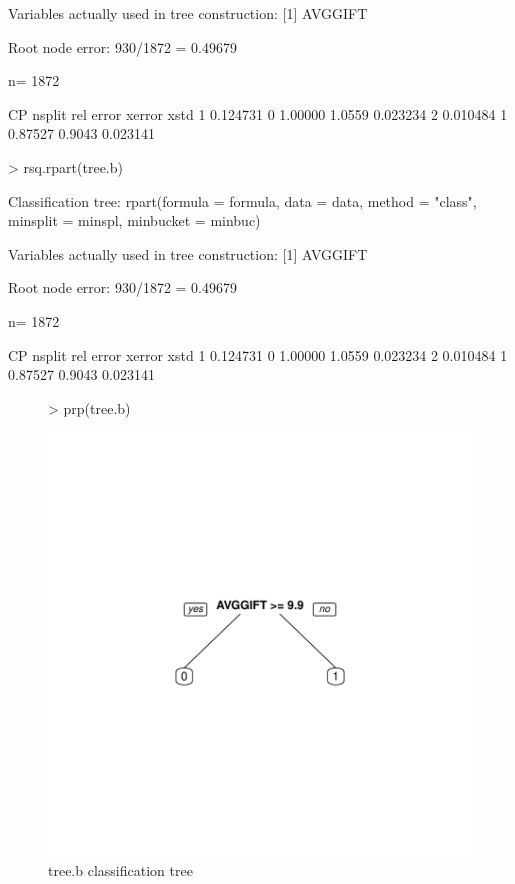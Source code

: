 \documentclass{article}
\begin{document}
\begin{Schunk}
\begin{Soutput}
Variables actually used in tree construction:
[1] AVGGIFT

Root node error: 930/1872 = 0.49679

n= 1872 

        CP nsplit rel error xerror     xstd
1 0.124731      0   1.00000 1.0559 0.023234
2 0.010484      1   0.87527 0.9043 0.023141
\end{Soutput}
\begin{Sinput}
> rsq.rpart(tree.b)
\end{Sinput}
\begin{Soutput}
Classification tree:
rpart(formula = formula, data = data, method = "class", minsplit = minspl, 
    minbucket = minbuc)

Variables actually used in tree construction:
[1] AVGGIFT

Root node error: 930/1872 = 0.49679

n= 1872 

        CP nsplit rel error xerror     xstd
1 0.124731      0   1.00000 1.0559 0.023234
2 0.010484      1   0.87527 0.9043 0.023141
\end{Soutput}
\end{Schunk}

\begin{figure}
\begin{center}
\begin{Schunk}
\begin{Sinput}
> prp(tree.b)
\end{Sinput}
\end{Schunk}
\includegraphics{DirectMailPrediction-015}
\end{center}
\caption{tree.b classification tree}
\label{classt-b}
\end{figure}
\end{document}
